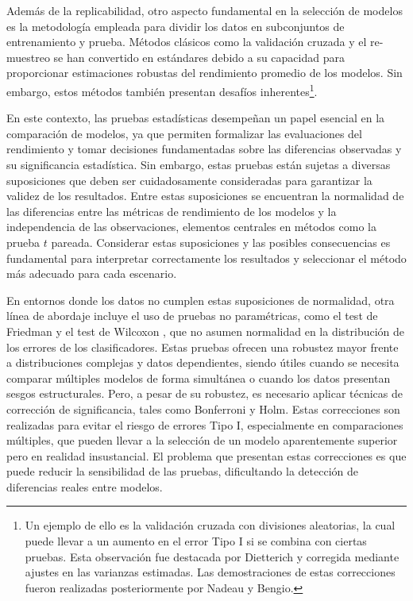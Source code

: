 \documentclass[a4paper,12pt]{article}
\begin{document}
Además de la replicabilidad, otro aspecto fundamental en la selección de modelos es la metodología empleada para dividir los datos en subconjuntos de entrenamiento y prueba. Métodos clásicos como la validación cruzada y el re-muestreo se han convertido en estándares debido a su capacidad para proporcionar estimaciones robustas del rendimiento promedio de los modelos. Sin embargo, estos métodos también presentan desafíos inherentes\footnote{Un ejemplo de ello es la validación cruzada con divisiones aleatorias, la cual puede llevar a un aumento en el error Tipo I si se combina con ciertas pruebas. Esta observación fue destacada por Dietterich y corregida mediante ajustes en las varianzas estimadas. Las demostraciones de estas correcciones fueron realizadas posteriormente por Nadeau y Bengio\cite{nadeau1999inference}.}.

En este contexto, las pruebas estadísticas desempeñan un papel esencial en la comparación de modelos, ya que permiten formalizar las evaluaciones del rendimiento y tomar decisiones fundamentadas sobre las diferencias observadas y su significancia estadística. Sin embargo, estas pruebas están sujetas a diversas suposiciones que deben ser cuidadosamente consideradas para garantizar la validez de los resultados. Entre estas suposiciones se encuentran la normalidad de las diferencias entre las métricas de rendimiento de los modelos y la independencia de las observaciones, elementos centrales en métodos como la prueba $t$ pareada. Considerar estas suposiciones y las posibles consecuencias es fundamental para interpretar correctamente los resultados y seleccionar el método más adecuado para cada escenario.

En entornos donde los datos no cumplen estas suposiciones de normalidad, otra línea de abordaje incluye el uso de pruebas no paramétricas, como el test de Friedman y el test de Wilcoxon \cite{demvsar2006statistical}, que no asumen normalidad en la distribución de los errores de los clasificadores. Estas pruebas ofrecen una robustez mayor frente a distribuciones complejas y datos dependientes, siendo útiles cuando se necesita comparar múltiples modelos de forma simultánea o cuando los datos presentan sesgos estructurales. Pero, a pesar de su robustez, es necesario aplicar técnicas de corrección de significancia, tales como Bonferroni y Holm. Estas correcciones son realizadas para evitar el riesgo de errores Tipo I, especialmente en comparaciones múltiples, que pueden llevar a la selección de un modelo aparentemente superior pero en realidad insustancial. El problema que presentan estas correcciones es que puede reducir la sensibilidad de las pruebas, dificultando la detección de diferencias reales entre modelos.
\end{document}
